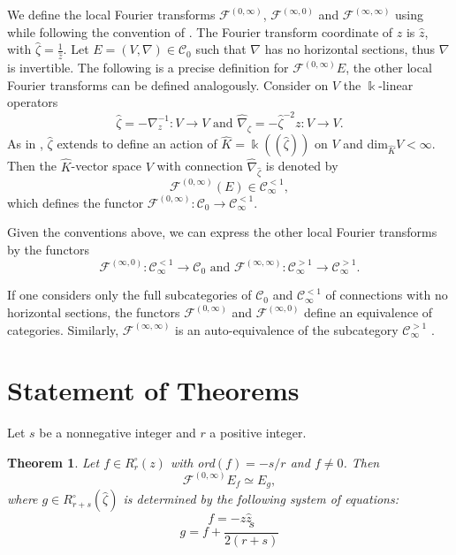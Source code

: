 \documentclass[11pt]{amsart}
\theoremstyle{theorem}
\newtheorem{theorem}{Theorem}[section]
\theoremstyle{lemma}
\theoremstyle{corollary}
\theoremstyle{proposition}
\theoremstyle{definition}
\theoremstyle{remark}
\def\z{\hat{\zeta}}
\begin{document}
We define the local Fourier transforms $\mathcal{F}^{(0,\infty)}$, $\mathcal{F}^{(\infty,0)}$ and $\mathcal{F}^{(\infty,\infty)}$ using \cite[Propositions 3.7, 3.9 and 3.12]{bloch} while following the convention of \cite[Section 2.2]{dima}.  The Fourier transform coordinate of $z$ is $\hat{z}$, with $\z=\frac{1}{\hat{z}}$. Let $E=(V,\nabla)\in\mathcal{C}_0$ such that $\nabla$ has no horizontal sections, thus $\nabla$ is invertible.  The following is a precise definition for $\mathcal{F}^{(0,\infty)}E$, the other local Fourier transforms can be defined analogously.  Consider on $V$ the $\Bbbk$-linear operators
\begin{equation}\label{fourierdef}
	\z=-\nabla_z^{-1}: V\to V \text{ and } \hat{\nabla}_{\z}=-\z^{-2}z: V \to V.
\end{equation}
As in \cite{dima}, $\z$ extends to define an action of $\hat{K}=\Bbbk((\z))$ on $V$ and dim$_{\hat{K}}V<\infty$.  Then the $\hat{K}$-vector space $V$ with connection $\hat{\nabla}_{\z}$ is denoted by
\[ \mathcal{F}^{(0,\infty)}(E)\in \mathcal{C}_{\infty}^{<1},\]
which defines the functor $\mathcal{F}^{(0,\infty)}:\mathcal{C}_0 \to \mathcal{C}_{\infty}^{<1}$.

Given the conventions above, we can express the other local Fourier transforms by the functors
$$\mathcal{F}^{(\infty,0)}:\mathcal{C}_{\infty}^{<1} \to \mathcal{C}_0 \text{   and   }\mathcal{F}^{(\infty,\infty)}:\mathcal{C}_{\infty}^{>1}\to \mathcal{C}_{\infty}^{>1}.$$

If one considers only the full subcategories of $\mathcal{C}_0$ and $\mathcal{C}_{\infty}^{<1}$ of connections with no horizontal sections, the functors $\mathcal{F}^{(0,\infty)}$ and $\mathcal{F}^{(\infty,0)}$ define an equivalence of categories.  Similarly, $\mathcal{F}^{(\infty,\infty)}$ is an auto-equivalence of the subcategory $\mathcal{C}_{\infty}^{>1}$ \cite[Propositions 3.10 and 3.12]{bloch}.

\section{Statement of Theorems}
Let $s$ be a nonnegative integer and $r$ a positive integer.

\begin{theorem}\label{thm1} \label{firstthm}Let $f\in R^{\circ}_r(z)$ with ord$(f)=-s/r$ and $f\neq 0$.  Then
\[\mathcal{F}^{(0,\infty)}E_f\simeq E_g,\]
where $g\in {R^{\circ}_{r+s}(\z)}$ is determined by the following system of equations:
\begin{equation}\label{zisyseq1}f=-z\hat{z}
\end{equation}
\begin{equation}\label{zisyseq2} g=f+\frac{s}{2(r+s)}
\end{equation}
\end{theorem}
\end{document}
